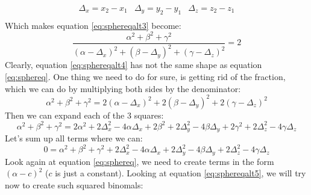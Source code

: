 \begin{equation}\label{eq:sphereqaltsub2}
    \begin{array}{ccc}
        \Delta_x = x_2 - x_1 & \Delta_y = y_2 - y_1 & \Delta_z = z_2 - z_1 \\
    \end{array}
\end{equation}
Which makes equation \ref{eq:sphereqalt3} become:
\begin{equation}\label{eq:sphereqalt4}
    \frac{\alpha^2 + \beta^2 + \gamma^2}{(\alpha  - \Delta_x)^2 + (\beta - \Delta_y)^2 + (\gamma - \Delta_z)^2} = 2
\end{equation}
Clearly, equation \ref{eq:sphereqalt4} has not the same shape as equation \ref{eq:sphereq}.
One thing we need to do for sure, is getting rid of the fraction, which we can
do by multiplying both sides by the denominator:
\begin{equation*}
    \alpha^2 + \beta^2 + \gamma^2 = 2(\alpha  - \Delta_x)^2 + 2(\beta - \Delta_y)^2 + 2(\gamma - \Delta_z)^2
\end{equation*}
Then we can expand each of the 3 squares:
\begin{equation*}
    \alpha^2 + \beta^2 + \gamma^2 =
        2\alpha^2  + 2\Delta^2_x - 4\alpha\Delta_x +
        2\beta^2  + 2\Delta^2_y - 4\beta\Delta_y +
        2\gamma^2  + 2\Delta^2_z - 4\gamma\Delta_z
\end{equation*}
Let's sum up all terms where we can:
\begin{equation}\label{eq:sphereqalt5}
    0 =
        \alpha^2 + \beta^2 + \gamma^2 +
        2\Delta^2_x - 4\alpha\Delta_x +
        2\Delta^2_y - 4\beta\Delta_y +
        2\Delta^2_z - 4\gamma\Delta_z
\end{equation}
Look again at equation \ref{eq:sphereq}, we need to create terms in the
form $(\alpha - c)^2$ ($c$ is just a constant). Looking at equation \ref{eq:sphereqalt5},
we will try now to create such squared binomals:
